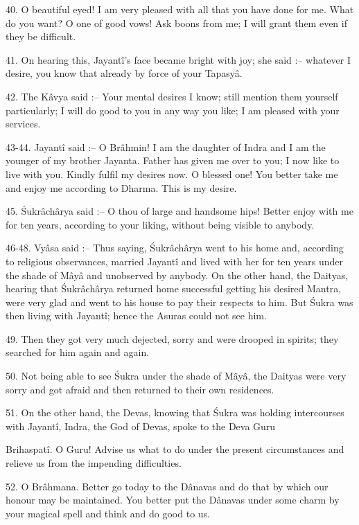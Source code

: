 40. O beautiful eyed! I am very pleased with all that you have done for me. What do you want? O one of good vows! Ask boons from me; I will grant them even if they be difficult.

41. On hearing this, Jayant\^i's face became bright with joy; she said :-- whatever I desire, you know that already by force of your Tapasy\^a.

42. The K\^avya said :-- Your mental desires I know; still mention them yourself particularly; I will do good to you in any way you like; I am pleased with your services.

43-44. Jayant\^i said :-- O Br\^ahmin! I am the daughter of Indra and I am the younger of my brother Jayanta. Father has given me over to you; I now like to live with you. Kindly fulfil my desires now. O blessed one! You better take me and enjoy me according to Dharma. This is my desire.

45. \'Sukr\^ach\^arya said :-- O thou of large and handsome hips! Better enjoy with me for ten years, according to your liking, without being visible to anybody.

46-48. Vy\^asa said :-- Thus saying, \'Sukr\^ach\^arya went to his home and, according to religious observances, married Jayant\^i and lived with her for ten years under the shade of M\^ay\^a and unobserved by anybody. On the other hand, the Daityas, hearing that \'Sukr\^ach\^arya returned home successful getting his desired Mantra, were very glad and went to his house to pay their respects to him. But \'Sukra was then living with Jayant\^i; hence the Asuras could not see him.

49. Then they got very much dejected, sorry and were drooped in spirits; they searched for him again and again.

50. Not being able to see \'Sukra under the shade of M\^ay\^a, the Daityas were very sorry and got afraid and then returned to their own residences.

51. On the other hand, the Devas, knowing that \'Sukra was holding intercourses with Jayant\^i, Indra, the God of Devas, spoke to the Deva Guru

Brihaspat\^i. O Guru! Advise us what to do under the present circumstances and relieve us from the impending difficulties.

52. O Br\^ahmana. Better go today to the D\^anavas and do that by which our honour may be maintained. You better put the D\^anavas under some charm by your magical spell and think and do good to us.

